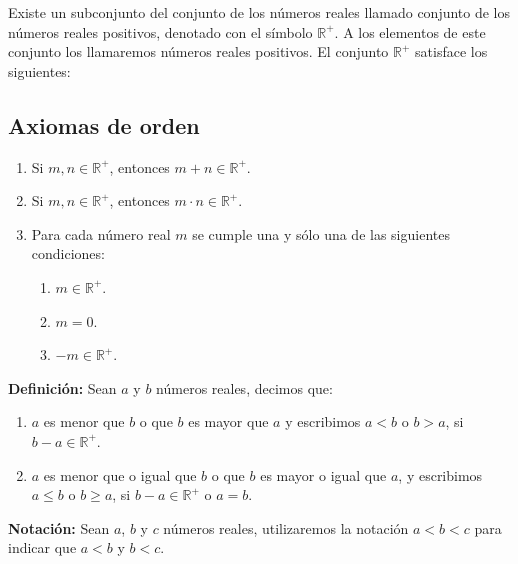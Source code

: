 \documentclass[11pt]{article}
\newcommand{\R}{\mathbb{R}}
\begin{document}
Existe un subconjunto del conjunto de los números reales llamado conjunto de los números reales positivos, denotado con el símbolo $\R^+$. A los elementos de este conjunto los llamaremos números reales positivos. El conjunto $\R^+$ satisface los siguientes:
%
\subsection*{Axiomas de orden}
%
\begin{enumerate}[label=O\arabic*)]
\item Si $m, n \in \R^+$, entonces $m + n \in \R^+$.
\item Si $m, n \in \R^+$, entonces $m \cdot n \in \R^+$.
\item Para cada número real $m$ se cumple una y sólo una de las siguientes condiciones:
    \begin{enumerate}[label=\roman*)]
    \item $m \in \R^+$.
    \item $m = 0$.
    \item $-m \in \R^+$.\
    \end{enumerate}
\end{enumerate}
%
\textbf{Definición:} Sean $a$ y $b$ números reales, decimos que:%
%
\begin{enumerate}
    \item $a$ es menor que $b$ o que $b$ es mayor que $a$ y escribimos $a<b$ o $b>a$, si $b-a \in \R^+$.
    \item $a$ es menor que o igual que $b$ o que $b$ es mayor o igual que $a$, y escribimos $a \leq b$ o $b \geq a$, si $b - a \in \R^+$ o $a = b$.
\end{enumerate}

\textbf{Notación:} Sean $a$, $b$ y $c$ números reales, utilizaremos la notación $a<b<c$ para indicar que $a<b$ y $b<c$.

\pagebreak
\end{document}
